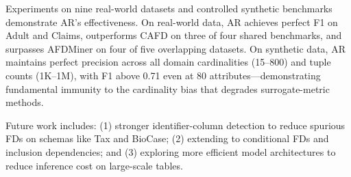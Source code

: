 \documentclass[conference]{IEEEtran}
\begin{document}
Experiments on nine real-world datasets and controlled synthetic benchmarks demonstrate AR's effectiveness. On real-world data, AR achieves perfect F1 on Adult and Claims, outperforms CAFD on three of four shared benchmarks, and surpasses AFDMiner on four of five overlapping datasets. On synthetic data, AR maintains perfect precision across all domain cardinalities (15--800) and tuple counts (1K--1M), with F1 above 0.71 even at 80 attributes---demonstrating fundamental immunity to the cardinality bias that degrades surrogate-metric methods.

Future work includes: (1) stronger identifier-column detection to reduce spurious FDs on schemas like Tax and BioCase; (2) extending to conditional FDs and inclusion dependencies; and (3) exploring more efficient model architectures to reduce inference cost on large-scale tables.
\end{document}
